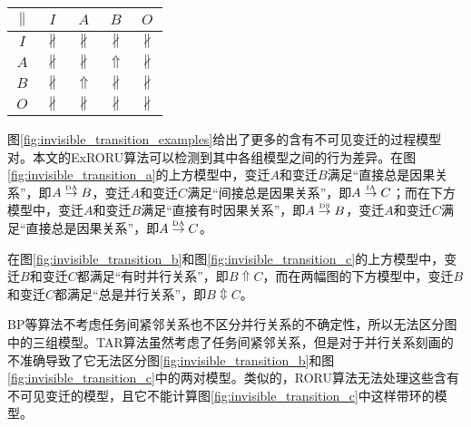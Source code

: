 \begin{table}[htbp]
\begin{subtable}{1\textwidth}
\begin{minipage}[b]{0.3\textwidth}
\begin{tabular}{|c|c|c|c|c|}
      \end{tabular}
    \end{minipage}
    \begin{minipage}[b]{0.3\textwidth}
      \centering
      \begin{tabular}{|c|c|c|c|c|} \hline
        $\parallel$ & $I$ & $A$ & $B$ & $O$\\ \hline
        $I$ & $\nparallel$ & $\nparallel$ & $\nparallel$ & $\nparallel$\\ \hline
        $A$ & $\nparallel$ & $\nparallel$ & $\Uparrow$ & $\nparallel$\\ \hline
        $B$ & $\nparallel$ & $\Uparrow$ & $\nparallel$ & $\nparallel$\\ \hline
        $O$ & $\nparallel$ & $\nparallel$ & $\nparallel$ & $\nparallel$\\ \hline
      \end{tabular}
    \end{minipage}
  \end{subtable}
\end{table}

图\ref{fig:invisible_transition_examples}给出了更多的含有不可见变迁的过程模型对。本文的ExRORU算法可以检测到其中各组模型之间的行为差异。在图\ref{fig:invisible_transition_a}的上方模型中，变迁$A$和变迁$B$满足“直接总是因果关系”，即$A\overset{\text{\tiny{DA}}}{\rightarrow}B$，变迁$A$和变迁$C$满足“间接总是因果关系”，即$A\overset{\text{\tiny{IA}}}{\rightarrow}C$；而在下方模型中，变迁$A$和变迁$B$满足“直接有时因果关系”，即$A\overset{\text{\tiny{DS}}}{\rightarrow}B$，变迁$A$和变迁$C$满足“直接总是因果关系”，即$A\overset{\text{\tiny{DA}}}{\rightarrow}C$。

在图\ref{fig:invisible_transition_b}和图\ref{fig:invisible_transition_c}的上方模型中，变迁$B$和变迁$C$都满足“有时并行关系”，即$B\Uparrow C$，而在两幅图的下方模型中，变迁$B$和变迁$C$都满足“总是并行关系”，即$B\Updownarrow C$。

BP等算法不考虑任务间紧邻关系也不区分并行关系的不确定性，所以无法区分图中的三组模型。TAR算法虽然考虑了任务间紧邻关系，但是对于并行关系刻画的不准确导致了它无法区分图\ref{fig:invisible_transition_b}和图\ref{fig:invisible_transition_c}中的两对模型。类似的，RORU算法无法处理这些含有不可见变迁的模型，且它不能计算图\ref{fig:invisible_transition_c}中这样带环的模型。

